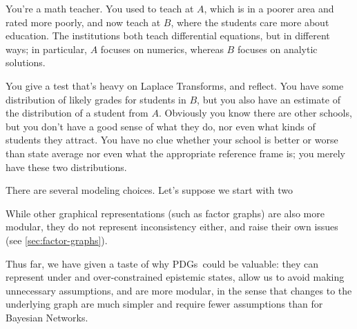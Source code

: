 \documentclass{article}
\newcommand\changeoff{\color{black} }
\newcommand{\MN}{PDG}
\newcommand{\MNs}{\MN s}
\begin{document}
		
	\begin{example}
		You're a math teacher. You used to teach at $A$, which is in a poorer area and rated more poorly, and now teach at $B$, where the students care more about education. The institutions both teach differential equations, but in different ways; in particular, $A$ focuses on numerics, whereas $B$ focuses on analytic solutions.
		
		You give a test that's heavy on Laplace Transforms, and reflect.
		You have some distribution of likely grades for students in $B$, but you also have an estimate of the distribution of a student from $A$. 
		Obviously you know there are other schools, but you don't have a good sense of what they do, nor even what kinds of students they attract.
		You have no clue whether your school is better or worse than state average nor even what the appropriate reference frame is; you merely have these two distributions.
		
		There are several modeling choices. Let's suppose we start with two 
		
		
		\begin{center}
		\end{center}
		
		
		

	\end{example}


	
	While other graphical representations (such as factor graphs) are also more modular, they do not represent inconsistency either, and raise their own issues (see \cref{sec:factor-graphs}). 
	
	Thus far, we have given a taste of why \MNs\ could be valuable: they can represent under and over-constrained epistemic states, allow us to avoid making unnecessary assumptions, and are more modular, in the sense that changes to the underlying graph are much simpler and require fewer assumptions than for Bayesian Networks.	
	\changeoff
	
\end{document}
